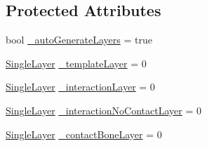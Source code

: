 \subsection*{Protected Attributes}
\begin{DoxyCompactItemize}
\item 
bool \mbox{\hyperlink{class_leap_1_1_unity_1_1_interaction_1_1_interaction_manager_a67b3425669699e61b3649ed83f5b3283}{\+\_\+auto\+Generate\+Layers}} = true
\item 
\mbox{\hyperlink{struct_leap_1_1_unity_1_1_single_layer}{Single\+Layer}} \mbox{\hyperlink{class_leap_1_1_unity_1_1_interaction_1_1_interaction_manager_a17b10e0cecd075456a90be0617c77b25}{\+\_\+template\+Layer}} = 0
\item 
\mbox{\hyperlink{struct_leap_1_1_unity_1_1_single_layer}{Single\+Layer}} \mbox{\hyperlink{class_leap_1_1_unity_1_1_interaction_1_1_interaction_manager_a829ba8a9a24d75793ff6f05f39d70134}{\+\_\+interaction\+Layer}} = 0
\item 
\mbox{\hyperlink{struct_leap_1_1_unity_1_1_single_layer}{Single\+Layer}} \mbox{\hyperlink{class_leap_1_1_unity_1_1_interaction_1_1_interaction_manager_a19f2155251076eb53a9083f8f5be2de4}{\+\_\+interaction\+No\+Contact\+Layer}} = 0
\item 
\mbox{\hyperlink{struct_leap_1_1_unity_1_1_single_layer}{Single\+Layer}} \mbox{\hyperlink{class_leap_1_1_unity_1_1_interaction_1_1_interaction_manager_a8e8253c955fd19ddf980040c058098c8}{\+\_\+contact\+Bone\+Layer}} = 0
\end{DoxyCompactItemize}
